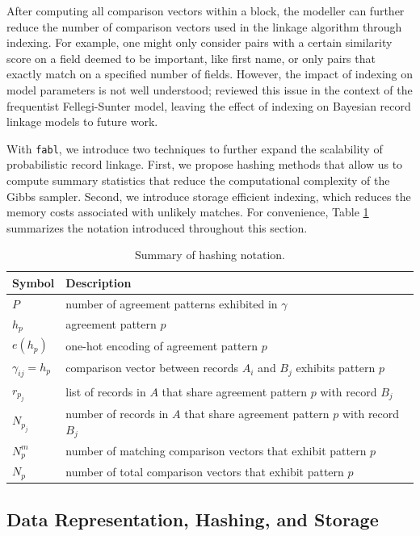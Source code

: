 \documentclass[ba]{imsart}
\begin{document}
After computing all comparison vectors within a block, the modeller can further reduce the number of comparison vectors used in the linkage algorithm through indexing. For example, one might only consider pairs with a certain similarity score on a field deemed to be important, like first name, or only pairs that exactly match on a specified number of fields. However, the impact of indexing on model parameters is not well understood; \citep{murray2016probabilistic} reviewed this issue in the context of the frequentist Fellegi-Sunter model, leaving the effect of indexing on Bayesian record linkage models to future work.

With \texttt{fabl}, we introduce two techniques to further expand the scalability of probabilistic record linkage. First, we propose hashing methods that allow us to compute summary statistics that reduce the computational complexity of the Gibbs sampler. Second, we introduce storage efficient indexing, which reduces the memory costs associated with unlikely matches. For convenience, Table \ref{table_notation_B} summarizes the notation introduced throughout this section.

\begin{table}[t!]
	\centering
	\begin{tabular}[t!]{ll}
		Symbol & Description \\
		\hline
		$P$ & number of agreement patterns exhibited in $\gamma$ \\
		$h_p$ & agreement pattern $p$ \\
		$e(h_p)$ & one-hot encoding of agreement pattern $p$ \\
		$\gamma_{ij} = h_p$ & comparison vector between records $A_i$ and $B_j$ exhibits pattern $p$ \\
		$r_{p_j}$ & list of records in $A$ that share agreement pattern $p$ with record $B_j$ \\
		$N_{p_j}$ & number of records in $A$ that share agreement pattern $p$ with record $B_j$ \\
		$N_p^m$ & number of matching comparison vectors that exhibit pattern $p$ \\
		$N_p$ & number of total comparison vectors that exhibit pattern $p$ \\

		\hline
	\end{tabular}\caption{Summary of hashing notation.}\label{table_notation_B}
\end{table}

\hypertarget{data-representation-hashing-and-storage}{%
	\subsection{Data Representation, Hashing, and
		Storage}\label{data-representation-hashing-and-storage}}
	
\end{document}
